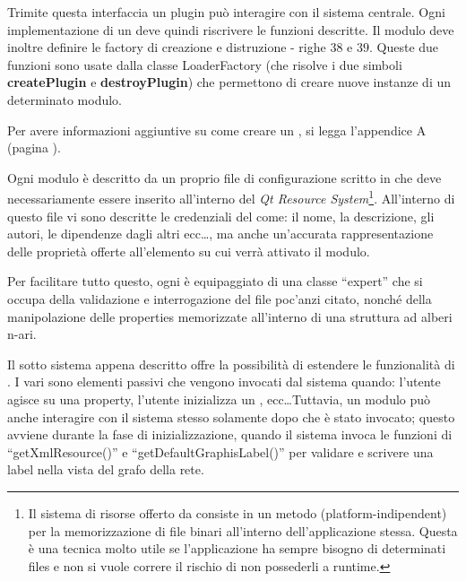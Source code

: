 Trimite questa interfaccia un plugin può interagire con il sistema centrale. Ogni implementazione di un \plugin{} deve quindi riscrivere le funzioni descritte. Il modulo deve inoltre definire le factory di creazione e distruzione - righe $38$ e $39$. Queste due funzioni sono usate dalla classe LoaderFactory (che risolve i due simboli \textbf{createPlugin} e \textbf{destroyPlugin}) che permettono di creare nuove instanze di un determinato modulo.

Per avere informazioni aggiuntive su come creare un \plugin{}, si legga l'appendice A (pagina \pageref{appendice_a}).

Ogni modulo è descritto da un proprio file di configurazione scritto in \xml{} che deve necessariamente essere inserito all'interno del \emph{Qt Resource System}\footnote{Il sistema di risorse offerto da \qt{} consiste in un metodo (platform-indipendent) per la memorizzazione di file binari all'interno dell'applicazione stessa. Questa è una tecnica molto utile se l'applicazione ha sempre bisogno di determinati files e non si vuole correre il rischio di non possederli a runtime.}. All'interno di questo file vi sono descritte le credenziali del \plugin{} come: il nome, la descrizione, gli autori, le dipendenze dagli altri \plugin{} ecc\ldots, ma anche un'accurata rappresentazione delle proprietà offerte all'elemento su cui verrà attivato il modulo.

Per facilitare tutto questo, ogni \proxy{} è equipaggiato di una classe ``expert'' che si occupa della validazione e interrogazione del file \xml{} poc'anzi citato, nonché della manipolazione delle properties memorizzate all'interno di una struttura ad alberi n-ari.

Il sotto sistema appena descritto offre la possibilità di estendere le funzionalità di \visualnetkit{}. I vari \plugin{} sono elementi passivi che vengono invocati dal sistema quando: l'utente agisce su una property, l'utente inizializza un \plugin{}, ecc\ldots Tuttavia, un modulo può anche interagire con il sistema stesso solamente dopo che è stato invocato; questo avviene durante la fase di inizializzazione, quando il sistema invoca le funzioni di ``getXmlResource()'' e ``getDefaultGraphisLabel()'' per validare e scrivere una label nella vista del grafo della rete.

